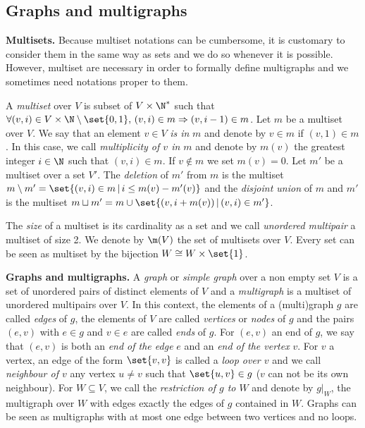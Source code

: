 \subsection{Graphs and multigraphs}\label{intro_graphs}

\textbf{Multisets.}
Because multiset notations can be cumbersome, it is customary to consider them in the same way as sets and we do so whenever it
is possible. However, multiset are necessary in order to formally define multigraphs and we sometimes need notations proper to them.

A {\em multiset} over $V$ is subset of $V\times\N^*$ such that $\forall (v,i)\in V\times\N\setminus\set{0,1},\, (v,i)\in m \Rightarrow (v,i-1)\in m$. Let $m$ be a multiset 
over $V$. We say that an element $v\in V$ {\em is in} $m$ and denote by $v\in m$ if $(v,1)\in m$. In this case, we call {\em multiplicity of $v$ in $m$} 
and denote by $m(v)$ the greatest integer $i\in\N$ such that $(v,i)\in m$. If $v\not\in m$ we set $m(v)=0$. Let $m'$ be a multiset over a set $V'$. The
{\em deletion} of $m'$ from $m$ is the multiset $m\setminus m' = \set{(v,i)\in m\,|\, i\leq m(v)-m'(v)}$ and the {\em disjoint union} of $m$ and
$m'$ is the multiset $m\sqcup m'= m\cup\set{(v,i+m(v))\,|\,(v,i)\in m'}$.

The {\em size} of a multiset is its cardinality as a set and we call {\em unordered multipair} a multiset of size 2. 
We denote by $\m(V)$ the set of multisets over $V$. 
Every set can be seen as multiset by the bijection $W\cong W\times\set{1}$.

\noindent\textbf{Graphs and multigraphs.}
A {\em graph} or {\em simple graph} over a non empty set $V$ is a set of unordered pairs of distinct elements of $V$ and a 
{\em multigraph} is a multiset of unordered multipairs over $V$. In this context, the elements of a 
(multi)graph $g$ are called {\em edges} of $g$, the elements of $V$ are called {\em vertices} or {\em nodes} of $g$ and the pairs
$(e,v)$ with $e\in g$ and $v\in e$ are called {\em ends} of $g$. For $(e,v)$ an end of $g$, we say that $(e,v)$ is both
an {\em end of the edge} $e$ and an {\em end of the vertex} $v$. For $v$ a vertex, an edge of the form $\set{v,v}$ 
is called a {\em loop over $v$} and we call {\em neighbour of $v$} any vertex $u\not = v$ such that $\set{u,v}\in g$ 
($v$ can not be its own neighbour). For $W\subseteq V$, we call the {\em restriction of $g$ to $W$} and denote by $g|_W$,
the multigraph over $W$ with edges exactly the edges of $g$ contained in $W$. 
Graphs can be seen as multigraphs with at most one edge between two vertices and no loops. 

